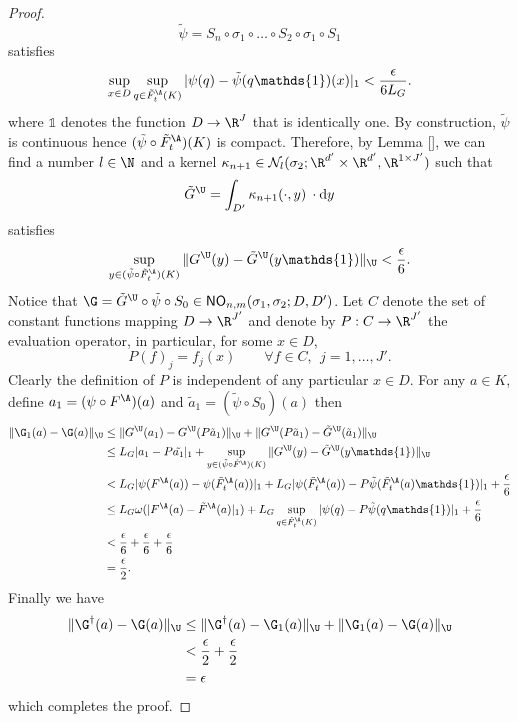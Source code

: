 \begin{proof}
\[\tilde{\psi} = S_n \circ \sigma_1 \circ \dots \circ S_2 \circ \sigma_1 \circ S_1 \]
satisfies
\[\sup_{x \in D} \sup_{q \in \tilde{F}^\A_t (K)} | \psi(q) - \tilde{\psi}(q \mathds{1})(x) |_1 < \frac{\epsilon}{6 L_G}. \]
where \(\mathds{1}\) denotes the function \(D \to \R^J\) that is identically one. By construction, \(\tilde{\psi}\) is continuous hence \((\tilde{\psi} \circ \tilde{F}^\A_t)(K)\) is compact. Therefore, by Lemma [], we can find a number \(l \in \N\) and a kernel 
\(\kappa_{n+1} \in \mathcal{N}_l (\sigma_2; \R^{d'} \times \R^{d'}, \R^{1 \times J'})\) such that
\[\tilde{G}^\U = \int_{D'} \kappa_{n+1} (\cdot, y) \: \cdot \text{d}y \]
satisfies
\[\sup_{y \in (\tilde{\psi}  \circ \tilde{F}^\A_t)(K)} \|G^\U (y) - \tilde{G}^\U (y \mathds{1}) \|_\U < \frac{\epsilon}{6}.\]
Notice that \(\G = \tilde{G}^\U \circ \tilde{\psi} \circ S_0 \in \mathsf{NO}_{n,m}(\sigma_1,\sigma_2;D,D')\). Let \(C\) denote the set of constant functions mapping \(D \to \R^{J'}\) and denote by \(P : C \to \R^{J'}\) the evaluation operator, in particular, for some \(x \in D\),
\[P(f)_j = f_j(x) \qquad \forall f \in C, \:\: j=1,\dots,J'.\]
Clearly the definition of \(P\) is independent of any particular \(x \in D\).
For any \(a \in K\), define \(a_1 = (\psi \circ F^\A) (a)\) and \(\tilde{a}_1 =  (\tilde{\psi} \circ S_0)(a)\) then
\begin{align*}
    \|\G_1(a) - \G(a)\|_\U &\leq \|G^\U (a_1) - G^\U (P \tilde{a}_1) \|_\U + \|G^\U (P\tilde{a}_1) - \tilde{G}^\U(\tilde{a}_1) \|_\U \\
    &\leq L_G |a_1 - P \tilde{a_1}|_1 + \sup_{y \in (\tilde{\psi} \circ \tilde{F}^\A)(K)} \|G^\U (y) - \tilde{G}^\U (y \mathds{1}) \|_\U \\
    &< L_G |\psi (F^\A(a)) - \psi(\tilde{F}^\A_t (a))|_1 + L_G |\psi(\tilde{F}^\A_t(a)) - P \tilde{\psi} (\tilde{F}^\A_t (a) \mathds{1}) |_1 + \frac{\epsilon}{6} \\
    &\leq L_G \omega (|F^\A(a) - \tilde{F}^\A (a)|_1 ) + L_G \sup_{q \in \tilde{F}^\A_t (K)} |\psi(q) - P \tilde{\psi}(q \mathds{1})|_1 + \frac{\epsilon}{6} \\
    &< \frac{\epsilon}{6} + \frac{\epsilon}{6} + \frac{\epsilon}{6} \\
    &= \frac{\epsilon}{2}.
\end{align*}
Finally we have
\begin{align*}
    \|\G^\dagger(a) - \G(a)\|_\U &\leq \|\G^\dagger (a) - \G_1(a) \|_\U + \|\G_1(a) - \G(a)\|_\U \\
    &< \frac{\epsilon}{2} + \frac{\epsilon}{2} \\
    &= \epsilon
\end{align*}
which completes the proof.
\end{proof}

